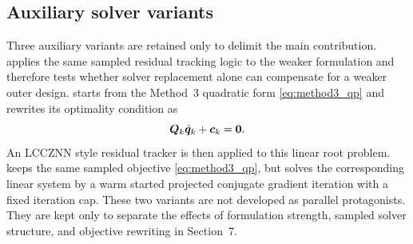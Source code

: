 \subsection{Auxiliary solver variants}

Three auxiliary variants are retained only to delimit the main contribution. \methodoneDL{} applies the same sampled residual tracking logic to the weaker \methodone{} formulation and therefore tests whether solver replacement alone can compensate for a weaker outer design. \methodthreelcc{} starts from the Method~3 quadratic form \eqref{eq:method3_qp} and rewrites its optimality condition as
\begin{equation}
  \bm{Q}_k \dot{\bm{q}}_k + \bm{c}_k = \bm{0}.
\end{equation}
An LCCZNN style residual tracker is then applied to this linear root problem. \methodthreepcg{} keeps the same sampled objective \eqref{eq:method3_qp}, but solves the corresponding linear system by a warm started projected conjugate gradient iteration with a fixed iteration cap. These two variants are not developed as parallel protagonists. They are kept only to separate the effects of formulation strength, sampled solver structure, and objective rewriting in Section~7.
